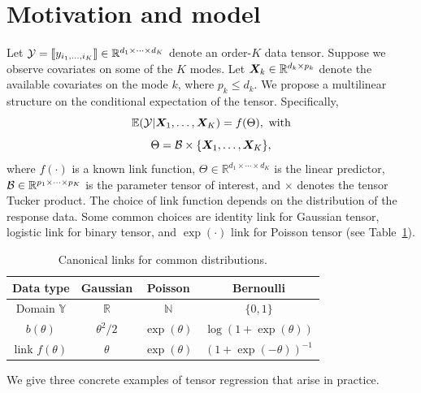 \documentclass{article}
\theoremstyle{plain}
\theoremstyle{definition}
\begin{document}
\section{Motivation and model}\label{sec:model}
Let $\mathcal{Y}=\llbracket y_{i_1,\ldots,i_K} \rrbracket\in\mathbb{R}^{d_1\times \cdots\times d_K}$ denote an order-$K$ data tensor. Suppose we observe covariates on some of the $K$ modes. Let $\bm X_k\in\mathbb{R}^{d_k\times p_k}$ denote the available covariates on the mode $k$, where $p_k\leq d_k$. We propose a multilinear structure on the conditional expectation of the tensor. Specifically, 
\begin{equation}\label{eq:tensormodel}
\mathbb{E}(\mathcal{Y}|\bm X_1,\ldots,\bm X_K)=f(\Theta),\ \text{with}
\end{equation}
\begin{equation}
\Theta =\mathcal{B}\times\{\bm X_1,\ldots,\bm X_K\} ,
\end{equation}
where $f(\cdot)$ is a known link function, $\Theta\in\mathbb{R}^{d_1\times \cdots\times d_K}$ is the linear predictor, $\mathcal{B}\in\mathbb{R}^{p_1\times \cdots \times p_K}$ is the parameter tensor of interest, and $\times$ denotes the tensor Tucker product. The choice of link function depends on the distribution of the response data. Some common choices are identity link for Gaussian tensor, logistic link for binary tensor, and $\exp(\cdot)$ link for Poisson tensor (see Table~\ref{table:link}). 

\begin{table}
\centering
\begin{tabular}{c|ccc}
Data type &Gaussian & Poisson& Bernoulli\\
\hline
Domain $\mathbb{Y}$& $\mathbb{R}$&$\mathbb{N}$&$\{0,1\}$\\
 $b(\theta)$&$\theta^2/2$& $\exp(\theta)$&$\log (1+\exp(\theta))$\\
 link $f(\theta)$&$\theta$&$\exp(\theta)$&$(1+\exp(-\theta))^{-1}$
\end{tabular}
\vspace{.2cm}
\caption{Canonical links for common distributions.}\label{table:link}
\vspace{-.6cm}
\end{table}

{We give three concrete examples of tensor regression that arise in practice. }
\end{document}
